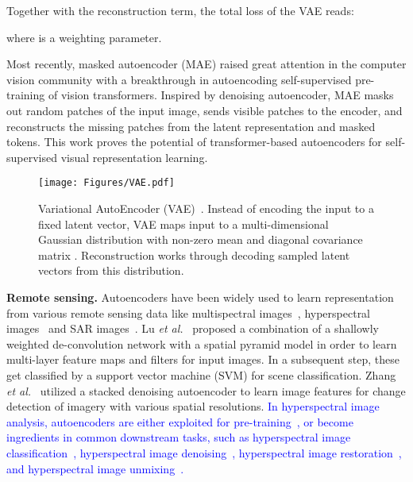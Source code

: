 \documentclass[lettersize,journal]{IEEEtran}
\newcommand{\etal}{\textit{et al.}}
\begin{document}
\noindent Together with the reconstruction term, the total loss  of the VAE reads:



\noindent where  is a weighting parameter.

Most recently, masked autoencoder (MAE) \cite{he2021masked} raised great attention in the computer vision community with a breakthrough in autoencoding self-supervised pre-training of vision transformers. Inspired by denoising autoencoder, MAE masks out random patches of the input image, sends visible patches to the encoder, and reconstructs the missing patches from the latent representation and masked tokens. This work proves the potential of transformer-based autoencoders for self-supervised visual representation learning.

\begin{figure}
\centering
\texttt{[image: Figures/VAE.pdf]}
\caption[vae]{Variational AutoEncoder (VAE)~\cite{kingma2013auto}. Instead of encoding the input  to a fixed latent vector, VAE maps input  to a multi-dimensional Gaussian distribution with non-zero mean  and diagonal covariance matrix . Reconstruction works through decoding sampled latent vectors  from this distribution.}
\label{fig:vae}
\end{figure}


\textbf{Remote sensing.} Autoencoders have been widely used to learn representation from various remote sensing data like multispectral images~\cite{lu2017remote,zhang2016change,sharma2021self,madhuanand2021self,peng2020urban,nguyen2021self,tomenotti2020heterogeneous,palsson2022blind}, hyperspectral images~\cite{kemker2017self,mou2017unsupervised,imamura2019self,hong2021endmember,yao2020cross,chen2021hyperspectral,li2021self,ozkan2018endnet} and SAR images~\cite{hughes2018mining,molini2021speckle2void,yuan2019blind,pu2022sae}.
Lu \etal~\cite{lu2017remote} proposed a combination of a shallowly weighted de-convolution network
with a spatial pyramid model in order to learn multi-layer feature maps and filters for input images.
In a subsequent step, these get classified by a support vector machine (SVM) for scene classification.
Zhang \etal~\cite{zhang2016change} utilized a stacked denoising autoencoder to learn image features for
change detection of imagery with various spatial resolutions. 
\textcolor{blue}{In hyperspectral image analysis, autoencoders are either exploited for pre-training~\cite{mou2017unsupervised}, or become ingredients in common downstream tasks, such as hyperspectral image classification~\cite{kemker2017self}, hyperspectral image denoising~\cite{9383811}, hyperspectral image restoration~\cite{imamura2019self, qian2021hyperspectral}, and hyperspectral image unmixing~\cite{hong2021endmember,palsson2022blind,ozkan2018endnet}. }
\end{document}
